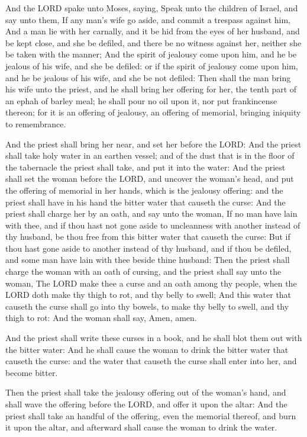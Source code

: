 \verse And the LORD spake unto Moses, saying, \verse Speak unto the
children of Israel, and say unto them, If any man's wife go aside, and
commit a trespass against him, \verse And a man lie with her carnally,
and it be hid from the eyes of her husband, and be kept close, and she
be defiled, and there be no witness against her, neither she be taken
with the manner; \verse And the spirit of jealousy come upon him, and he
be jealous of his wife, and she be defiled: or if the spirit of
jealousy come upon him, and he be jealous of his wife, and she be not
defiled: \verse Then shall the man bring his wife unto the priest, and
he shall bring her offering for her, the tenth part of an ephah of
barley meal; he shall pour no oil upon it, nor put frankincense
thereon; for it is an offering of jealousy, an offering of memorial,
bringing iniquity to remembrance.

\verse And the priest shall bring her near, and set her before the LORD:
\verse And the priest shall take holy water in an earthen vessel; and of
the dust that is in the floor of the tabernacle the priest shall take,
and put it into the water: \verse And the priest shall set the woman
before the LORD, and uncover the woman's head, and put the offering of
memorial in her hands, which is the jealousy offering: and the priest
shall have in his hand the bitter water that causeth the curse: \verse
And the priest shall charge her by an oath, and say unto the woman, If
no man have lain with thee, and if thou hast not gone aside to
uncleanness with another instead of thy husband, be thou free from
this bitter water that causeth the curse: \verse But if thou hast gone
aside to another instead of thy husband, and if thou be defiled, and
some man have lain with thee beside thine husband: \verse Then the
priest shall charge the woman with an oath of cursing, and the priest
shall say unto the woman, The LORD make thee a curse and an oath among
thy people, when the LORD doth make thy thigh to rot, and thy belly to
swell; \verse And this water that causeth the curse shall go into thy
bowels, to make thy belly to swell, and thy thigh to rot: And the
woman shall say, Amen, amen.

\verse And the priest shall write these curses in a book, and he shall
blot them out with the bitter water: \verse And he shall cause the woman
to drink the bitter water that causeth the curse: and the water that
causeth the curse shall enter into her, and become bitter.

\verse Then the priest shall take the jealousy offering out of the
woman's hand, and shall wave the offering before the LORD, and offer
it upon the altar: \verse And the priest shall take an handful of the
offering, even the memorial thereof, and burn it upon the altar, and
afterward shall cause the woman to drink the water.

